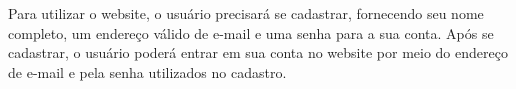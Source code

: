 Para utilizar o website, o usuário precisará se cadastrar, fornecendo seu nome completo, um endereço válido de e-mail e uma senha para a sua conta. Após se cadastrar, o usuário poderá entrar em sua conta no website por meio do endereço de e-mail e pela senha utilizados no cadastro.




%
%
%
%
%
